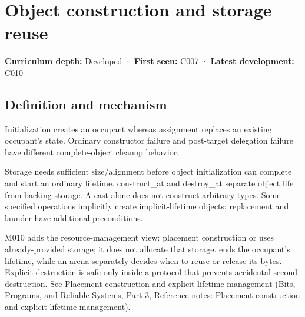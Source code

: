 \hypertarget{appendix-a82f9c438857}{}\label{referencestart:appendix-a82f9c438857}
\section{Object construction and storage reuse}\label{appendix-a82f9c438857-object-construction-and-storage-reuse}

\hypertarget{appendix-a82f9c438857-object-construction-and-storage-reuse}{}

\textbf{Curriculum depth:} Developed · \textbf{First seen:} C007 · \textbf{Latest development:} C010

\begin{allmightroledefinition}

\subsection{Definition and mechanism}\label{appendix-a82f9c438857-definition-and-mechanism}

\hypertarget{appendix-a82f9c438857-definition-and-mechanism}{}

Initialization creates an occupant whereas assignment replaces an existing occupant's state. Ordinary constructor failure and post-target delegation failure have different complete-object cleanup behavior.

\end{allmightroledefinition}

Storage needs sufficient size/alignment before object initialization can complete and start an ordinary lifetime. construct\_at and destroy\_at separate object life from backing storage. A cast alone does not construct arbitrary types. Some specified operations implicitly create implicit-lifetime objects; replacement and launder have additional preconditions.

M010 adds the resource-management view: placement construction or  uses already-provided storage; it does not allocate that storage.  ends the occupant's lifetime, while an arena separately decides when to reuse or release its bytes. Explicit destruction is safe only inside a protocol that prevents accidental second destruction. See \href{../01-Bits-Programs-and-Reliable-Systems-P03/main.pdf\#appendix-f56c3e43fd4e}{Placement construction and explicit lifetime management (Bits, Programs, and Reliable Systems, Part 3, Reference notes: Placement construction and explicit lifetime management)}.

